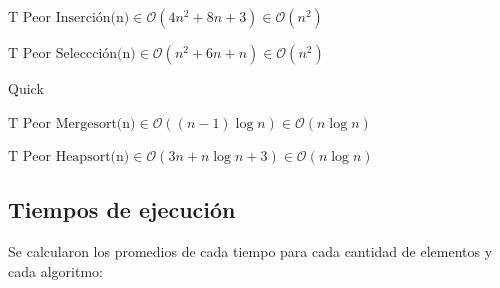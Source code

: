 \documentclass[article,a4paper]{article}
\begin{document}
$\mbox{T Peor Inserción(n)} \in \mathcal O(4n^2 + 8n + 3) \in \mathcal O(n^2)$

$\mbox{T Peor Seleccción(n)} \in \mathcal O(n^2 + 6n + n) \in \mathcal O(n^2)$ 

Quick

$\mbox{T Peor Mergesort(n)} \in \mathcal O((n-1) \log n) \in \mathcal O(n \log n) $

$\mbox{T Peor Heapsort(n)} \in \mathcal O(3n + n \log n + 3) \in \mathcal O(n \log n)$

\subsection{Tiempos de ejecución}

Se calcularon los promedios de cada tiempo para cada cantidad de elementos y cada algoritmo:
\end{document}
